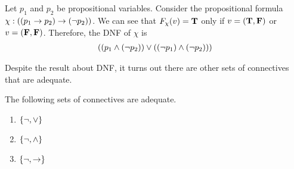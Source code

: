 \begin{boxexample}
    Let $p_1$ and $p_2$ be propositional variables. Consider the propositional formula $\chi : \left( \left( p_1 \to p_2 \right) \to \left( \neg p_2 \right) \right)$. We can see that $F_{\chi}(v) = \mathbf{T}$ only if $v = \left( \mathbf{T}, \mathbf{F} \right)$ or $v = \left( \mathbf{F}, \mathbf{F} \right)$. Therefore, the DNF of $\chi$ is
    \begin{align*}
        \left( \left( p_1 \land \left( \neg p_2 \right) \right) \lor \left( \left( \neg p_1 \right) \land \left( \neg p_2 \right) \right) \right)
    \end{align*}
\end{boxexample}

Despite the result about DNF, it turns out there are other sets of connectives that are adequate.

\begin{boxlemma}
    The following sets of connectives are adequate.
    \begin{enumerate}[noitemsep]
        \item $\left\{ \neg, \lor \right\}$
        \item $\left\{ \neg, \land \right\}$
        \item $\left\{ \neg, \to \right\}$
    \end{enumerate}
\end{boxlemma}
